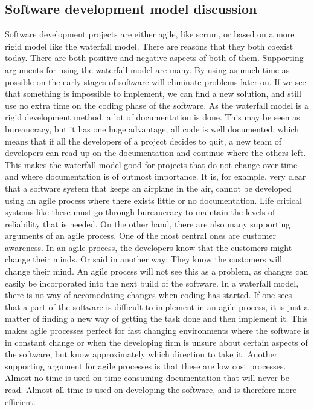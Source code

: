 \subsection{Software development model discussion}
Software development projects are either agile, like scrum, or based on a more rigid model like the waterfall model. There are reasons that they both coexist today. There are both positive and negative aspects of both of them. 
\newline
\newline
Supporting arguments for using the waterfall model are many. By using as much time as possible on the early stages of software will eliminate problems later on. If we see that something is impossible to implement, we can find a new solution, and still use no extra time on the coding phase of the software. 
\newline
\newline
As the waterfall model is a rigid development method, a lot of documentation is done. This may be seen as bureaucracy, but it has one huge advantage; all code is well documented, which means that if all the developers of a project decides to quit, a new team of developers can read up on the documentation and continue where the others left. This makes the waterfall model good for projects that do not change over time and where documentation is of outmost importance. It is, for example, very clear that a software system that keeps an airplane in the air, cannot be developed using an agile process where there exists little or no documentation. Life critical systems like these must go through bureaucracy to maintain the levels of reliability that is needed. 
\newline
\newline
On the other hand, there are also many supporting arguments of an agile process. One of the most central ones are customer awareness. In an agile process, the developers know that the customers might change their minds. Or said in another way: They know the customers will change their mind. An agile process will not see this as a problem, as changes can easily be incorporated into the next build of the software. In a waterfall model, there is no way of accomodating changes when coding has started. If one sees that a part of the software is difficult to implement in an agile process, it is just a matter of finding a new way of getting the task done and then implement it.  This makes agile processes perfect for fast changing environments where the software is in constant change or when the developing firm is unsure about certain aspects of the software, but know approximately which direction to take it.  
\newline
\newline
Another supporting argument for agile processes is that these are low cost processes. Almost no time is used on time consuming documentation that will never be read. Almost all time is used on developing the software, and is therefore more efficient. 

